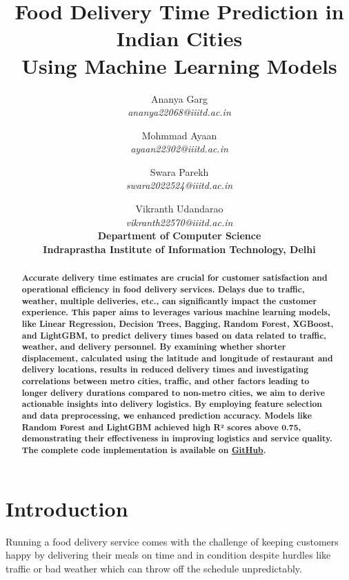 \documentclass[10pt,twocolumn,letterpaper]{article}
\begin{document}
\title{Food Delivery Time Prediction in Indian Cities \\ Using Machine Learning Models}

\author{
    Ananya Garg \\ 
    \textit{ananya22068@iiitd.ac.in} 
    \and 
    Mohmmad Ayaan \\ 
    \textit{ayaan22302@iiitd.ac.in} 
    \and 
    Swara Parekh \\ 
    \textit{swara2022524@iiitd.ac.in} 
    \and 
    Vikranth Udandarao \\ 
    \textit{vikranth22570@iiitd.ac.in} 
    \\[1.5em]
    \textbf{Department of Computer Science} \\
    \textbf{Indraprastha Institute of Information Technology, Delhi}
}

\maketitle

\begin{abstract}
    \textbf{Accurate delivery time estimates are crucial for customer satisfaction and operational efficiency in food delivery services. Delays due to traffic, weather, multiple deliveries, etc., can significantly impact the customer experience. This paper aims to leverages various machine learning models, like Linear Regression, Decision Trees, Bagging, Random Forest, XGBoost, and LightGBM, to predict delivery times based on data related to traffic, weather, and delivery personnel. By examining whether shorter displacement, calculated using the latitude and longitude of restaurant and delivery locations, results in reduced delivery times and investigating correlations between metro cities, traffic, and other factors leading to longer delivery durations compared to non-metro cities, we aim to derive actionable insights into delivery logistics. By employing feature selection and data preprocessing, we enhanced prediction accuracy. Models like Random Forest and LightGBM achieved high R² scores above 0.75, demonstrating their effectiveness in improving logistics and service quality. The complete code implementation is available on \href{https://github.com/Vikranth3140/Food-Delivery-Time-Prediction}{GitHub}.}
\end{abstract}

\section{Introduction}
Running a food delivery service comes with the challenge of keeping customers happy by delivering their meals on time and in condition despite hurdles like traffic or bad weather which can throw off the schedule unpredictably.
\end{document}

